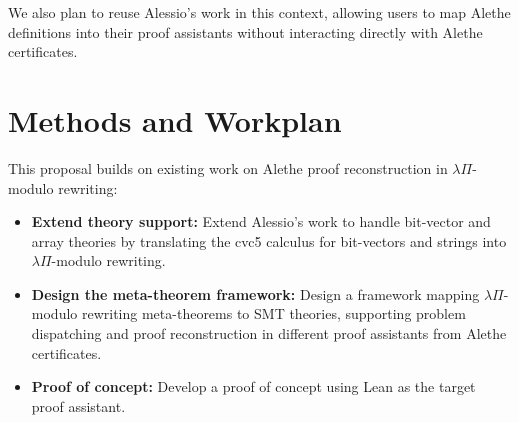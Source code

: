 \documentclass[11pt,twoside]{article}
\begin{document}
We also plan to reuse Alessio's work \cite{alessio} in this context, allowing users to map Alethe definitions into their proof assistants without interacting directly with Alethe certificates.

\section{Methods and Workplan}

This proposal builds on existing work on Alethe proof reconstruction in $\lambda\Pi$-modulo rewriting:

\begin{itemize}
    \item \textbf{Extend theory support:} Extend Alessio's work to handle bit-vector and array theories by translating the cvc5 calculus for bit-vectors and strings into $\lambda\Pi$-modulo rewriting.
    \item \textbf{Design the meta-theorem framework:} Design a framework mapping $\lambda\Pi$-modulo rewriting meta-theorems to SMT theories, supporting problem dispatching and proof reconstruction in different proof assistants from Alethe certificates.
    \item \textbf{Proof of concept:} Develop a proof of concept using Lean as the target proof assistant.
\end{itemize}



\clearpage
{}
{} %




\end{document}
